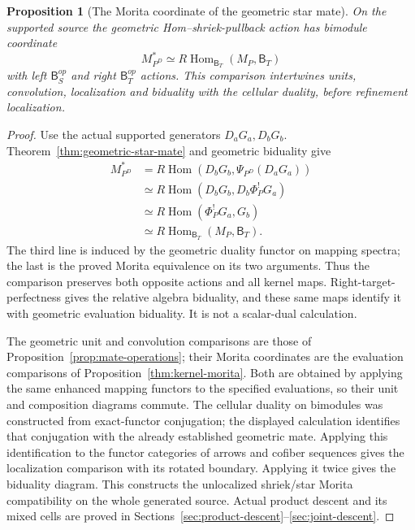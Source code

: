 \documentclass[11pt]{article}
\newtheorem{proposition}{Proposition}[section]
\theoremstyle{definition}
\theoremstyle{remark}
\newcommand{\RHom}{R\operatorname{Hom}}
\begin{document}
\begin{proposition}[The Morita coordinate of the geometric star mate]
\label{thm:morita-star}
On the supported source the geometric Hom--shriek-pullback action
has bimodule coordinate
\[
 M_{P^D}^{*}\simeq
       R\operatorname{Hom}_{\mathsf B_T}(M_P,\mathsf B_T)
\]
with left $\mathsf B_S^{op}$ and right $\mathsf B_T^{op}$ actions.
This comparison intertwines units, convolution, localization and
biduality with the cellular duality, before refinement localization.
\end{proposition}
\begin{proof}
Use the actual supported generators $D_aG_a,D_bG_b$.
Theorem~\ref{thm:geometric-star-mate} and geometric biduality give
\begin{align*}
 M_{P^D}^{*}
 &=\RHom(D_bG_b,\Psi_{P^D}(D_aG_a))\\
 &\simeq\RHom(D_bG_b,D_b\Phi_P^!G_a)\\
 &\simeq\RHom(\Phi_P^!G_a,G_b)\\
 &\simeq R\operatorname{Hom}_{\mathsf B_T}(M_P,\mathsf B_T).
\end{align*}
The third line is induced by the geometric duality functor on
mapping spectra; the last is the proved Morita equivalence on its
two arguments.  Thus the comparison preserves both opposite actions
and all kernel maps.  Right-target-perfectness gives the relative
algebra biduality, and these same maps identify it with geometric
evaluation biduality.  It is not a scalar-dual calculation.

The geometric unit and convolution comparisons are those of
Proposition~\ref{prop:mate-operations}; their Morita coordinates are
the evaluation comparisons of Proposition~\ref{thm:kernel-morita}.
Both are obtained by applying the same enhanced mapping functors
to the specified evaluations, so their unit and composition diagrams
commute.  The cellular duality on bimodules was constructed from
exact-functor conjugation; the displayed calculation identifies
that conjugation with the already established geometric mate.
Applying this identification to the functor categories of arrows and
cofiber sequences gives the localization comparison with its rotated
boundary.  Applying it twice gives the biduality diagram.  This
constructs the unlocalized shriek/star Morita compatibility on the
whole generated source.  Actual product descent and its mixed cells
are proved in Sections~\ref{sec:product-descent}--\ref{sec:joint-descent}.


\end{proof}
\end{document}
